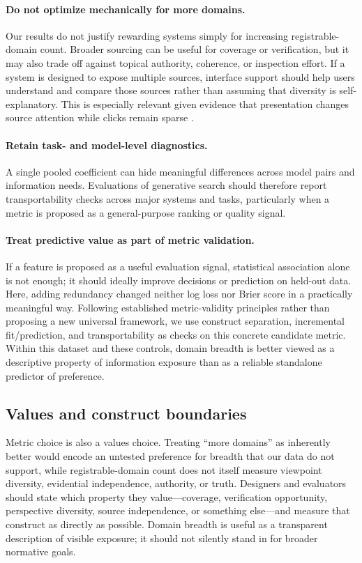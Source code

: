 \documentclass[sigconf,natbib=true,anonymous=true]{acmart}
\begin{document}
\paragraph{Do not optimize mechanically for more domains.}
Our results do not justify rewarding systems simply for increasing registrable-domain count. Broader sourcing can be useful for coverage or verification, but it may also trade off against topical authority, coherence, or inspection effort. If a system is designed to expose multiple sources, interface support should help users understand and compare those sources rather than assuming that diversity is self-explanatory. This is especially relevant given evidence that presentation changes source attention while clicks remain sparse \citep{he2026transparency}.

\paragraph{Retain task- and model-level diagnostics.}
A single pooled coefficient can hide meaningful differences across model pairs and information needs. Evaluations of generative search should therefore report transportability checks across major systems and tasks, particularly when a metric is proposed as a general-purpose ranking or quality signal.

\paragraph{Treat predictive value as part of metric validation.}
If a feature is proposed as a useful evaluation signal, statistical association alone is not enough; it should ideally improve decisions or prediction on held-out data. Here, adding redundancy changed neither log loss nor Brier score in a practically meaningful way. Following established metric-validity principles rather than proposing a new universal framework, we use construct separation, incremental fit/prediction, and transportability as checks on this concrete candidate metric. Within this dataset and these controls, domain breadth is better viewed as a descriptive property of information exposure than as a reliable standalone predictor of preference.

\subsection{Values and construct boundaries}
Metric choice is also a values choice. Treating ``more domains'' as inherently better would encode an untested preference for breadth that our data do not support, while registrable-domain count does not itself measure viewpoint diversity, evidential independence, authority, or truth. Designers and evaluators should state which property they value---coverage, verification opportunity, perspective diversity, source independence, or something else---and measure that construct as directly as possible. Domain breadth is useful as a transparent description of visible exposure; it should not silently stand in for broader normative goals.
\end{document}
